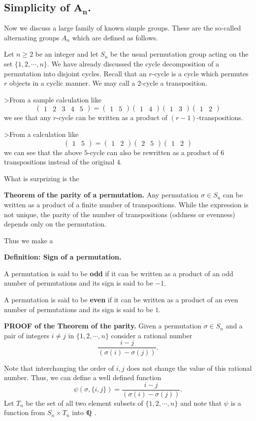 \documentclass[12pt]{article}
\newcommand{\deff}[1]{{\bf Definition: #1} }
\def\DQ{ \mbox{\rm\hbox{Q \kern-0.85em\raise0.25ex
    	\hbox{\vrule height5.4pt width0.7pt} \kern0.45em}} }
\newcommand{\matr}[2]{\left( \begin{array}{*{#1}{r}}#2\end{array}\right)}
\begin{document}
\subsection{Simplicity of $\mathbf{A_n}$.}
Now we discuss a large family of known simple groups. These are the
so-called alternating groups $A_n$ which are defined as follows.

Let $n\geq 2$ be an integer and let $S_n$ be the usual permutation group
acting on the set $\{1,2,\cdots,n\}$.
We have already discussed the cycle decomposition of a permutation into
disjoint cycles.
Recall that an $r$-cycle is a cycle which permutes $r$ objects in a
cyclic manner. We may call a $2$-cycle a transposition.

>From a sample calculation like
$$\matr{5}{1 & 2 & 3 & 4 & 5} =
\matr{2}{1 & 5}\matr{2}{1 & 4} \matr{2}{1 & 3} \matr{2}{1 & 2} $$
we see that any $r$-cycle can be written as a product of
$(r-1)$-transpositions.

>From a calculation like
$$\matr{2}{1 & 5} = \matr{2}{1 & 2} \matr{2}{2 & 5} \matr{2}{1 & 2}$$
we can see that the above $5$-cycle can also be rewritten as a
product of $6$ transpositions instead of the original $4$.

What is surprizing is the

{\bf Theorem of the parity of a permutation.}
Any permutation $\sigma \in S_n$ can be written as a product of
a finite number of transpositions. While the expression is not unique,
the parity of the number of transpositions (oddness or evenness) depends
only on the permutation.

Thus we make a

\deff{Sign of a permutation.}

A permutation is said to be {\bf odd} if it can be written as a product of an
odd number of permutations and its sign is said to be $-1$.

A permutation is said to be {\bf even} if it can be written as a product of an
even number of permutations and its sign is said to be $1$.

{\bf PROOF of the Theorem of the parity.} Given a permutation $\sigma \in S_n$
and a pair of integers $i \neq j $ in $\{1,2,\cdots,n\}$ consider a
rational number
$$\frac{i-j}{(\sigma(i)-\sigma(j))}.$$

Note that interchanging the order of $i,j$ does not change the
value of this rational number.
Thus, we can define a well defined function
$$\psi(\sigma,\{i,j\})=\frac{i-j}{(\sigma(i)-\sigma(j))}.$$ 
Let $T_n$ be the set of all two element subsets of $\{1,2,\cdots,n\}$ and note
that $\psi$ is a function from $S_n\times T_n$ into $\DQ$.
\end{document}
